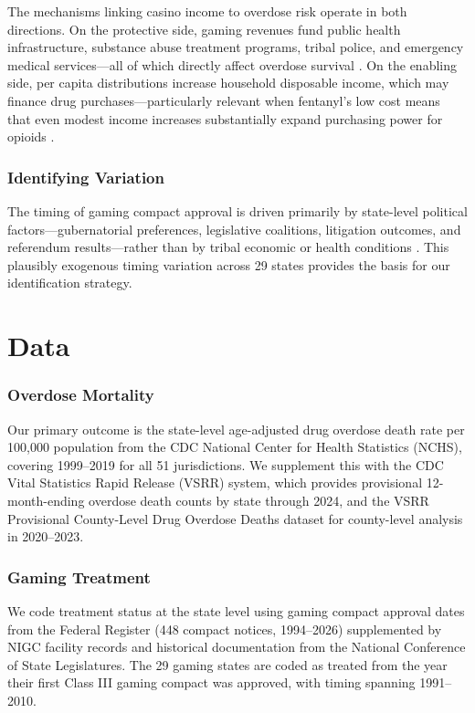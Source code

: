 \documentclass[12pt]{article}
\begin{document}
The mechanisms linking casino income to overdose risk operate in both directions. On the protective side, gaming revenues fund public health infrastructure, substance abuse treatment programs, tribal police, and emergency medical services---all of which directly affect overdose survival \citep{akee2015young}. On the enabling side, per capita distributions increase household disposable income, which may finance drug purchases---particularly relevant when fentanyl's low cost means that even modest income increases substantially expand purchasing power for opioids \citep{doleac2020moral}.

\subsubsection*{Identifying Variation} The timing of gaming compact approval is driven primarily by state-level political factors---gubernatorial preferences, legislative coalitions, litigation outcomes, and referendum results---rather than by tribal economic or health conditions \citep{cookson2015tribal}. This plausibly exogenous timing variation across 29 states provides the basis for our identification strategy.

\section{Data}

\subsubsection*{Overdose Mortality} Our primary outcome is the state-level age-adjusted drug overdose death rate per 100,000 population from the CDC National Center for Health Statistics (NCHS), covering 1999--2019 for all 51 jurisdictions. We supplement this with the CDC Vital Statistics Rapid Release (VSRR) system, which provides provisional 12-month-ending overdose death counts by state through 2024, and the VSRR Provisional County-Level Drug Overdose Deaths dataset for county-level analysis in 2020--2023.

\subsubsection*{Gaming Treatment} We code treatment status at the state level using gaming compact approval dates from the Federal Register (448 compact notices, 1994--2026) supplemented by NIGC facility records and historical documentation from the National Conference of State Legislatures. The 29 gaming states are coded as treated from the year their first Class III gaming compact was approved, with timing spanning 1991--2010.
\end{document}
